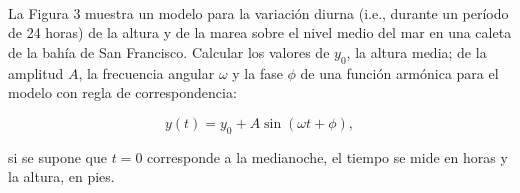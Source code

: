 \documentclass[12pt]{article}
\begin{document}
     \\
    La Figura 3 muestra un modelo para la variación diurna (i.e., durante un período de 24 horas) de la altura y de la marea sobre el nivel medio del mar en una caleta de la bahía de San Francisco. Calcular los valores de \( y_0 \), la altura media; de la amplitud \( A \), la frecuencia angular \( \omega \) y la fase \( \phi \) de una función armónica para el modelo con regla de correspondencia:

\[
y(t) = y_0 + A \sin(\omega t + \phi),
\]

si se supone que \( t = 0 \) corresponde a la medianoche, el tiempo se mide en horas y la altura, en pies.

    
\end{document}
